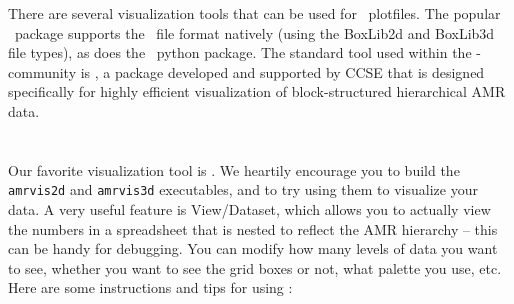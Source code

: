 There are several visualization tools that can be used for \amrex\
plotfiles.  The popular \visit\ package supports the \amrex\ file 
format natively (using the {\sf BoxLib2d} and {\sf BoxLib3d} file types),
as does the \yt\ python package.  The standard tool used within the
\amrex-community is \amrvis, a package developed and supported 
by CCSE that is designed specifically for highly efficient visualization
of block-structured hierarchical AMR data.

\section{\amrvis}

Our favorite visualization tool is \amrvis. We heartily encourage you
to build the {\tt amrvis2d} and {\tt amrvis3d} executables, and to try using them
to visualize your data. A very useful feature is View/Dataset, which
allows you to actually view the numbers in a spreadsheet that is nested
to reflect the AMR hierarchy -- this can be handy for
debugging. You can modify how many levels of data you want to see,
whether you want to see the grid boxes or not, what palette you use,
etc.  Here are some instructions and tips for using \amrvis:

